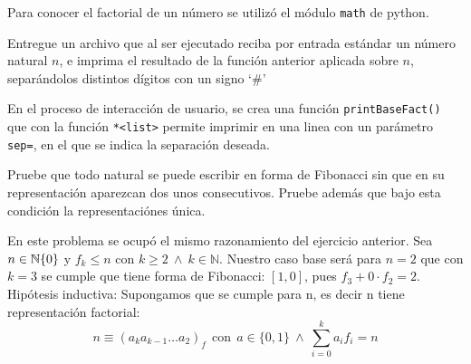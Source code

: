 \documentclass[letterpaper,10pt]{article}
\begin{document}
Para conocer el factorial de un número se utilizó el módulo \texttt{math} de python.\\

\begin{tcolorbox}
 Entregue un archivo que al ser ejecutado reciba por entrada estándar un número natural $n$, e imprima el resultado de la función anterior aplicada sobre $n$, separándolos distintos dígitos con un signo `\#'
\end{tcolorbox}

En el proceso de interacción de usuario, se crea una función \texttt{printBaseFact()} que con la función \texttt{*<list>} permite imprimir en una linea con un parámetro \texttt{sep=}, en el que se indica la separación deseada.\\


\begin{tcolorbox}
 Pruebe que todo natural se puede escribir en forma de Fibonacci sin que en su representación aparezcan dos unos consecutivos. Pruebe además que bajo esta condición la representaciónes única.
\end{tcolorbox}


En este problema se ocupó el mismo razonamiento del ejercicio anterior. Sea $n\in \mathbb{N}\\ \{0\} $ y $f_k \leq n$ con $k\geq 2\ \wedge\ k \in \mathbb{N}$. Nuestro caso base será para $n=2$ que con $k=3$ se cumple que tiene forma de Fibonacci: $[1,0]$, pues $f_3 + 0\cdot f_2 =2$.\\

Hipótesis inductiva: Supongamos que se cumple para n, es decir n tiene representación factorial:
\begin{equation*}
n \equiv (a_k a_{k-1} \ldots a_2)_f\ \   \textrm{con}\ \ a \in \{0,1\}\ \wedge\ \sum_{i=0}^{k}a_i f_i = n 
\end{equation*}
\end{document}
